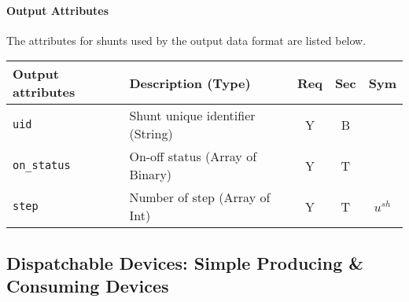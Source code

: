 \documentclass{article}
\begin{document}
\paragraph{Output Attributes} The attributes for shunts used by the output data format are listed below.

\begin{center}
\small
\begin{tabular}{ l | l | c | c | c |}
Output attributes & Description (Type) & Req & Sec & Sym\\
\hline
  {\tt uid} & Shunt unique identifier (String) & Y & B & \\
  {\tt on\_status} & On-off status (Array of Binary) & Y & T & \\
  {\tt step}      & Number of step (Array of Int)  & Y  & T &$u^{sh}$\\
\hline
\end{tabular}
\end{center}


\subsection{Dispatchable Devices: Simple Producing \& Consuming Devices}
\label{nom:gen_single}
\end{document}
